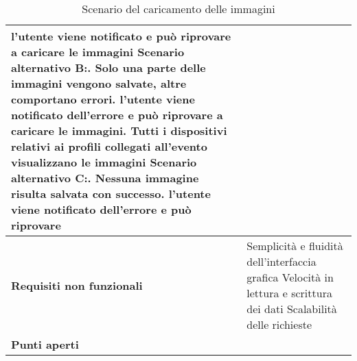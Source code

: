 \begin{table}[htb]
\begin{tabular} {|P{4.5cm}|P{11cm}|}
        l'utente viene notificato e può riprovare a caricare le immagini\newline
        Scenario alternativo B:. Solo una parte delle immagini vengono salvate, altre comportano errori. l'utente viene notificato dell'errore e può riprovare a caricare le immagini. Tutti i dispositivi relativi ai profili collegati all'evento visualizzano le immagini\newline
        Scenario alternativo C:. Nessuna immagine risulta salvata con successo. l'utente viene notificato dell'errore e può riprovare                                                            \\
        \hline
        \textbf{Requisiti non funzionali} & Semplicità e fluidità dell'interfaccia grafica   \linebreak
        Velocità in lettura e scrittura dei dati\linebreak
        Scalabilità delle richieste                                                                                         \\
        \hline
        \textbf{Punti aperti}             &                                                                                 \\
        \hline
    \end{tabular}

    \caption{Scenario del caricamento delle immagini}
\end{table}
\clearpage

